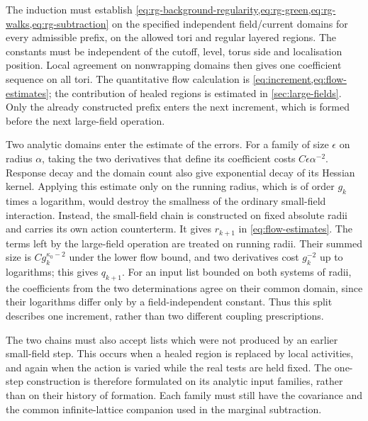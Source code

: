 \documentclass[11pt,letterpaper,reqno]{amsart}
\theoremstyle{definition}
\theoremstyle{remark}
\begin{document}
The induction must establish
\cref{eq:rg-background-regularity,eq:rg-green,eq:rg-walks,eq:rg-subtraction}
on the specified independent field/current domains for every admissible
prefix, on the allowed tori and regular layered regions. The constants
must be independent of the cutoff, level, torus side and localisation
position. Local agreement on nonwrapping domains then gives one
coefficient sequence on all tori. The quantitative flow calculation is
\cref{eq:increment,eq:flow-estimates}; the contribution of healed regions
is estimated in \cref{sec:large-fields}. Only the already constructed
prefix enters the next increment, which is formed before the next
large-field operation.

Two analytic domains enter the estimate of the errors. For a
family of size $\epsilon$ on radius $\alpha$, taking the two
derivatives that define its coefficient costs
$C\epsilon\alpha^{-2}$. Response decay and the domain count
also give exponential decay of its Hessian kernel. Applying this
estimate only on the running radius, which is of order $g_k$
times a logarithm, would destroy the smallness of the ordinary
small-field interaction. Instead, the small-field chain is
constructed on fixed absolute radii and carries its own action
counterterm. It gives $r_{k+1}$ in
\eqref{eq:flow-estimates}. The terms left by the large-field
operation are treated on running radii. Their summed size is
$Cg_k^{\kappa_0-2}$ under the lower flow bound, and two
derivatives cost $g_k^{-2}$ up to logarithms; this gives
$q_{k+1}$. For an input list bounded on both systems of radii,
the coefficients from the two determinations agree on their
common domain, since their logarithms differ only by a
field-independent constant. Thus this split describes one
increment, rather than two different coupling prescriptions.

The two chains must also accept lists which were not produced by an
earlier small-field step. This occurs when a healed region is replaced
by local activities, and again when the action is varied while the real
tests are held fixed. The one-step construction is therefore formulated
on its analytic input families, rather than on their history of
formation. Each family must still have the covariance and the common
infinite-lattice companion used in the marginal subtraction.
\end{document}
